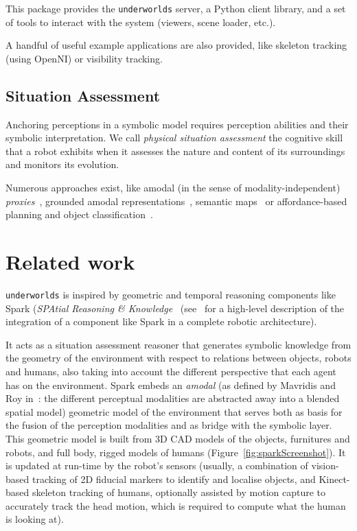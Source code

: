 \documentclass[letterpaper, 10 pt, conference]{ieeeconf}  %
\newcommand{\uwds}{{\tt underworlds}\xspace}
\begin{document}
This package provides the \uwds server, a Python client library, and a set
of tools to interact with the system (viewers, scene loader, etc.).

A handful of useful example applications are also provided, like skeleton
tracking (using OpenNI) or visibility tracking.



\subsection{Situation Assessment}

Anchoring perceptions in a symbolic model requires perception abilities and
their symbolic interpretation. We call \emph{physical situation assessment} the
cognitive skill that a robot exhibits when it assesses the nature and content of its
surroundings and monitors its evolution.

Numerous approaches exist, like amodal (in the sense of modality-independent)
\emph{proxies}~\cite{Jacobsson2008}, grounded amodal
representations~\cite{Mavridis2006}, semantic
maps~\cite{Nuechter2008, Galindo2008,Blodow2011} or affordance-based planning
and object classification~\cite{Lorken2008, Varadarajan2011}.


\section{Related work}


\cite{sisbot2011situation}
\cite{naef2003blue}
\cite{bustos2016unified}

\uwds is inspired by geometric and temporal reasoning components like {\sc
Spark} (\emph{SPAtial Reasoning \&
Knowledge}~\cite{sisbot2011situation} (see~\cite{lemaignan2016artificial} for a
high-level description of the integration of a component like {\sc Spark} in a
complete robotic architecture).

It acts as a situation assessment reasoner that generates symbolic knowledge from the
geometry of the environment with respect to relations between objects, robots
and humans, also
taking into account the different perspective that each agent has on the
environment.  {\sc Spark} embeds an \emph{amodal} (as defined by Mavridis and
Roy in~\cite{Mavridis2006}: the different perceptual modalities are abstracted
away into a blended spatial model) geometric model of the environment that
serves both as basis for the fusion of the perception modalities and as bridge
with the symbolic layer. This geometric model is built from 3D CAD models of the
objects, furnitures and robots, and full body, rigged models of humans
(Figure~\ref{fig:sparkScreenshot}).  It is updated at run-time by the robot's
sensors (usually, a combination of vision-based tracking of 2D fiducial markers
to identify and localise objects, and Kinect-based skeleton tracking of humans,
optionally assisted by motion capture to accurately track the head motion, which
is required to compute what the human is looking at).
\end{document}
